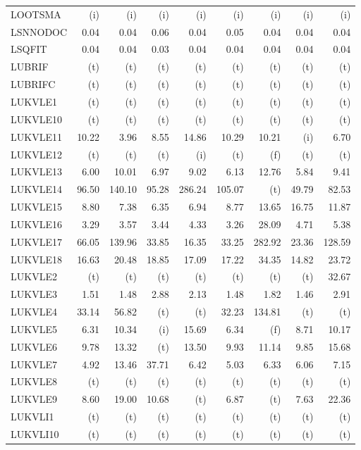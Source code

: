 \documentclass[11pt,twoside]{article}
\begin{document}
{\begin{longtable}[c]{|l|r|r|r|r|r|r|r|r|}
LOOTSMA & (i) & (i) & (i) & (i) & (i) & (i) & (i) & (i) \\
LSNNODOC & 0.04 & 0.04 & 0.06 & 0.04 & 0.05 & 0.04 & 0.04 & 0.04 \\
LSQFIT & 0.04 & 0.04 & 0.03 & 0.04 & 0.04 & 0.04 & 0.04 & 0.04 \\
LUBRIF & (t) & (t) & (t) & (t) & (t) & (t) & (t) & (t) \\
LUBRIFC & (t) & (t) & (t) & (t) & (t) & (t) & (t) & (t) \\
LUKVLE1 & (t) & (t) & (t) & (t) & (t) & (t) & (t) & (t) \\
LUKVLE10 & (t) & (t) & (t) & (t) & (t) & (t) & (t) & (t) \\
LUKVLE11 & 10.22 & 3.96 & 8.55 & 14.86 & 10.29 & 10.21 & (i) & 6.70 \\
LUKVLE12 & (t) & (t) & (t) & (i) & (t) & (f) & (t) & (t) \\
LUKVLE13 & 6.00 & 10.01 & 6.97 & 9.02 & 6.13 & 12.76 & 5.84 & 9.41 \\
LUKVLE14 & 96.50 & 140.10 & 95.28 & 286.24 & 105.07 & (t) & 49.79 & 82.53 \\
LUKVLE15 & 8.80 & 7.38 & 6.35 & 6.94 & 8.77 & 13.65 & 16.75 & 11.87 \\
LUKVLE16 & 3.29 & 3.57 & 3.44 & 4.33 & 3.26 & 28.09 & 4.71 & 5.38 \\
LUKVLE17 & 66.05 & 139.96 & 33.85 & 16.35 & 33.25 & 282.92 & 23.36 & 128.59 \\
LUKVLE18 & 16.63 & 20.48 & 18.85 & 17.09 & 17.22 & 34.35 & 14.82 & 23.72 \\
LUKVLE2 & (t) & (t) & (t) & (t) & (t) & (t) & (t) & 32.67 \\
LUKVLE3 & 1.51 & 1.48 & 2.88 & 2.13 & 1.48 & 1.82 & 1.46 & 2.91 \\
LUKVLE4 & 33.14 & 56.82 & (t) & (t) & 32.23 & 134.81 & (t) & (t) \\
LUKVLE5 & 6.31 & 10.34 & (i) & 15.69 & 6.34 & (f) & 8.71 & 10.17 \\
LUKVLE6 & 9.78 & 13.32 & (t) & 13.50 & 9.93 & 11.14 & 9.85 & 15.68 \\
LUKVLE7 & 4.92 & 13.46 & 37.71 & 6.42 & 5.03 & 6.33 & 6.06 & 7.15 \\
LUKVLE8 & (t) & (t) & (t) & (t) & (t) & (t) & (t) & (t) \\
LUKVLE9 & 8.60 & 19.00 & 10.68 & (t) & 6.87 & (t) & 7.63 & 22.36 \\
LUKVLI1 & (t) & (t) & (t) & (t) & (t) & (t) & (t) & (t) \\
LUKVLI10 & (t) & (t) & (t) & (t) & (t) & (t) & (t) & (t) \\

\end{longtable}}
\end{document}
